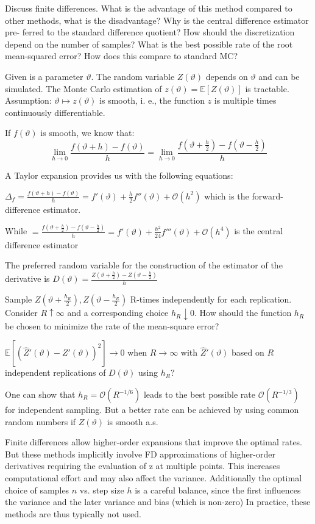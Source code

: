 Discuss finite differences. What is the advantage of this method compared to other
methods, what is the disadvantage? Why is the central difference estimator pre-
ferred to the standard difference quotient? How should the discretization depend
on the number of samples? What is the best possible rate of the root mean-squared
error? How does this compare to standard MC?


Given is a parameter \( ϑ \).
The random variable \( Z(ϑ) \) depends on \( ϑ \) and can be simulated.
The Monte Carlo estimation of \( z(ϑ) = \mathbb{E}[Z(ϑ)] \) is tractable.
Assumption: \( ϑ \mapsto z(ϑ) \) is smooth, i. e., the function \( z \) is multiple times continuously differentiable.


If \(f(\vartheta)\) is smooth, we know that:
\[ \lim_{h \to 0} \frac{f(\vartheta + h) - f(\vartheta)}{h} = \lim_{h \to 0} \frac{f(\vartheta + \frac{h}{2}) - f(\vartheta - \frac{h}{2})}{h} \]

A Taylor expansion provides us with the following equations:

\( \Delta_f = \frac{f(\vartheta + h) - f(\vartheta)}{h} = f'(\vartheta) + \frac{h}{2} f''(\vartheta) + \mathcal{O}(h^2)\) 
which is the forward-difference estimator.

While
\(= \frac{f(\vartheta + \frac{h}{2}) - f(\vartheta - \frac{h}{2})}{h} = f'(\vartheta) + \frac{h^2}{24} f'''(\vartheta) + \mathcal{O}(h^4)\)
is the central difference estimator

The preferred random variable for the construction of the estimator of the derivative is
\( D(\vartheta) = \frac{Z(\vartheta + \frac{h}{2}) - Z(\vartheta - \frac{h}{2})}{h} \)

Sample \( Z(\vartheta + \frac{h_R}{2}), Z(\vartheta - \frac{h_R}{2}) \)
R-times independently for each replication.
Consider \( R \uparrow \infty \)  and a corresponding choice \( h_R \downarrow 0 \).
How should the function \( h_R \) be chosen to minimize the rate of the mean-square error?

\(\mathbb{E}[(\hat{Z}'(\vartheta) - Z'(\vartheta) )^2] \to 0 \)
when \( R \to \infty \) with \( \hat{Z}'(\vartheta) \) 
based on \( R \) independent replications of \( D(\vartheta) \)  using \( h_R \)? 

One can show that \( h_R = \mathcal{O}(R^{-1/6}) \) leads to the best possible rate \(  \mathcal{O}(R^{-1/3}) \)   for independent sampling.
But a better rate can be achieved by using common random numbers if \( Z(\vartheta) \) is smooth a.s.

Finite differences allow higher-order expansions that improve the optimal rates. But these methods implicitly involve FD approximations of
higher-order derivatives requiring the evaluation of z at multiple points. This increases computational effort and may also affect the
variance. Additionally the optimal choice of samples \( n \) vs. step size \( h \) is a careful balance,
since the first influences the variance and the later variance and bias (which is non-zero)
In practice, these methods are thus typically not used.

